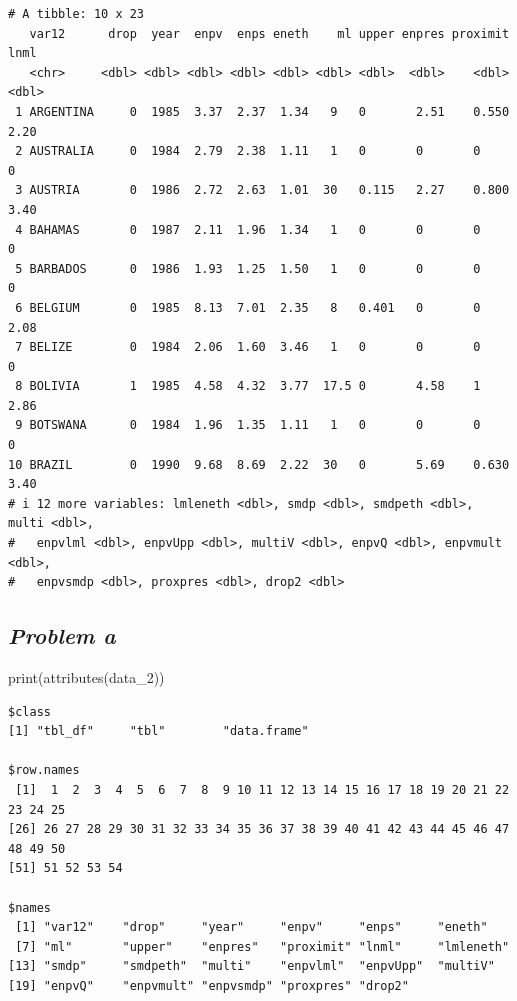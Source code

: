 \documentclass[
  letterpaper,
  DIV=11,
  numbers=noendperiod]{scrartcl}
\newenvironment{Shaded}{\begin{snugshade}}{\end{snugshade}}
\newcommand{\FunctionTok}[1]{\textcolor[rgb]{0.28,0.35,0.67}{#1}}
\newcommand{\NormalTok}[1]{\textcolor[rgb]{0.00,0.23,0.31}{#1}}
\begin{document}
\begin{verbatim}
# A tibble: 10 x 23
   var12      drop  year  enpv  enps eneth    ml upper enpres proximit  lnml
   <chr>     <dbl> <dbl> <dbl> <dbl> <dbl> <dbl> <dbl>  <dbl>    <dbl> <dbl>
 1 ARGENTINA     0  1985  3.37  2.37  1.34   9   0       2.51    0.550  2.20
 2 AUSTRALIA     0  1984  2.79  2.38  1.11   1   0       0       0      0   
 3 AUSTRIA       0  1986  2.72  2.63  1.01  30   0.115   2.27    0.800  3.40
 4 BAHAMAS       0  1987  2.11  1.96  1.34   1   0       0       0      0   
 5 BARBADOS      0  1986  1.93  1.25  1.50   1   0       0       0      0   
 6 BELGIUM       0  1985  8.13  7.01  2.35   8   0.401   0       0      2.08
 7 BELIZE        0  1984  2.06  1.60  3.46   1   0       0       0      0   
 8 BOLIVIA       1  1985  4.58  4.32  3.77  17.5 0       4.58    1      2.86
 9 BOTSWANA      0  1984  1.96  1.35  1.11   1   0       0       0      0   
10 BRAZIL        0  1990  9.68  8.69  2.22  30   0       5.69    0.630  3.40
# i 12 more variables: lmleneth <dbl>, smdp <dbl>, smdpeth <dbl>, multi <dbl>,
#   enpvlml <dbl>, enpvUpp <dbl>, multiV <dbl>, enpvQ <dbl>, enpvmult <dbl>,
#   enpvsmdp <dbl>, proxpres <dbl>, drop2 <dbl>
\end{verbatim}

\subsection{\texorpdfstring{\emph{Problem
a}}{Problem a}}\label{problem-a-2}

\begin{Shaded}
\begin{Highlighting}[]
\FunctionTok{print}\NormalTok{(}\FunctionTok{attributes}\NormalTok{(data\_2))}
\end{Highlighting}
\end{Shaded}

\begin{verbatim}
$class
[1] "tbl_df"     "tbl"        "data.frame"

$row.names
 [1]  1  2  3  4  5  6  7  8  9 10 11 12 13 14 15 16 17 18 19 20 21 22 23 24 25
[26] 26 27 28 29 30 31 32 33 34 35 36 37 38 39 40 41 42 43 44 45 46 47 48 49 50
[51] 51 52 53 54

$names
 [1] "var12"    "drop"     "year"     "enpv"     "enps"     "eneth"   
 [7] "ml"       "upper"    "enpres"   "proximit" "lnml"     "lmleneth"
[13] "smdp"     "smdpeth"  "multi"    "enpvlml"  "enpvUpp"  "multiV"  
[19] "enpvQ"    "enpvmult" "enpvsmdp" "proxpres" "drop2"   
\end{verbatim}
\end{document}
